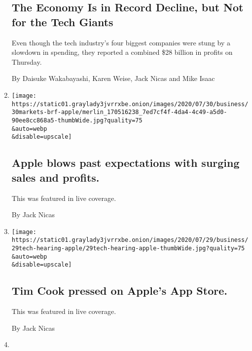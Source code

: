 \begin{enumerate}
  \hypertarget{the-economy-is-in-record-decline-but-not-for-the-tech-giants-1}{%
  \subsection{The Economy Is in Record Decline, but Not for the Tech
  Giants}\label{the-economy-is-in-record-decline-but-not-for-the-tech-giants-1}}

  Even though the tech industry's four biggest companies were stung by a
  slowdown in spending, they reported a combined \$28 billion in profits
  on Thursday.

  By Daisuke Wakabayashi, Karen Weise, Jack Nicas and Mike Isaac
\item
  \href{/live/2020/07/30/business/stock-market-today-coronavirus/apple-blows-past-expectations-with-surging-sales-and-profits}{}

  \texttt{[image: https://static01.graylady3jvrrxbe.onion/images/2020/07/30/business/30markets-brf-apple/merlin\_170516238\_7ed7cf4f-4da4-4c49-a5d0-90ee8cc868a5-thumbWide.jpg?quality=75\\\&auto=webp\\\&disable=upscale]}

  \hypertarget{apple-blows-past-expectations-with-surging-sales-and-profits}{%
  \subsection{Apple blows past expectations with surging sales and
  profits.}\label{apple-blows-past-expectations-with-surging-sales-and-profits}}

  This was featured in live coverage.

  By Jack Nicas
\item
  \href{/live/2020/07/29/technology/tech-ceos-hearing-testimony/tim-cook-pressed-on-apples-app-store}{}

  \texttt{[image: https://static01.graylady3jvrrxbe.onion/images/2020/07/29/business/29tech-hearing-apple/29tech-hearing-apple-thumbWide.jpg?quality=75\\\&auto=webp\\\&disable=upscale]}

  \hypertarget{tim-cook-pressed-on-apples-app-store}{%
  \subsection{Tim Cook pressed on Apple's App
  Store.}\label{tim-cook-pressed-on-apples-app-store}}

  This was featured in live coverage.

  By Jack Nicas
\item
  \href{/live/2020/07/29/technology/tech-ceos-hearing-testimony/what-to-expect-from-the-hearing}{}


\end{enumerate}
